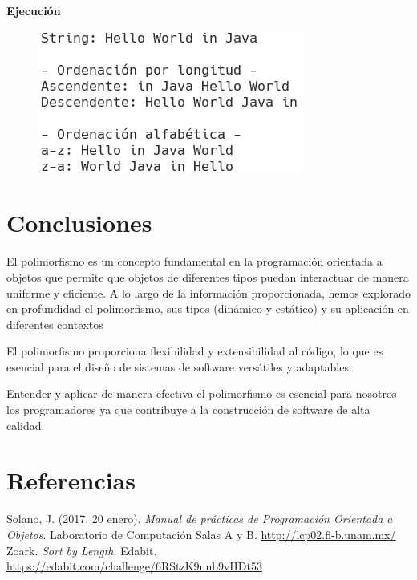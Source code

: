 \documentclass[11pt, twocolumn]{article}
\begin{document}
  \textbf{Ejecución}
  \begin{figure}[h!]
    \includegraphics[width=0.6\columnwidth, center]{P4.png}
  \end{figure}

  \section*{Conclusiones}
  El polimorfismo es un concepto fundamental en la programación orientada a objetos que permite que objetos de diferentes tipos puedan interactuar de manera uniforme y eficiente. A lo largo de la información proporcionada, hemos explorado en profundidad el polimorfismo, sus tipos (dinámico y estático) y su aplicación en diferentes contextos
  
  El polimorfismo proporciona flexibilidad y extensibilidad al código, lo que es esencial para el diseño de sistemas de software versátiles y adaptables.

  Entender y aplicar de manera efectiva el polimorfismo es esencial para nosotros los programadores ya que contribuye a la construcción de software de alta calidad.


  \section*{Referencias}
  \small
  Solano, J. (2017, 20 enero). \textit{Manual de prácticas de Programación Orientada a Objetos}. Laboratorio de Computación Salas A y B. \url{http://lcp02.fi-b.unam.mx/} \\

  Zoark. \textit{Sort by Length}. Edabit. \url{https://edabit.com/challenge/6RStzK9uub9vHDt53}
\end{document}

